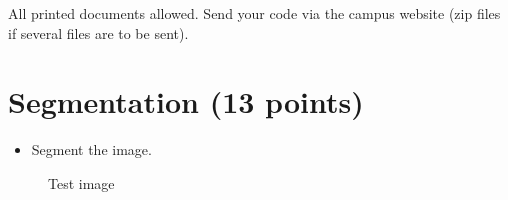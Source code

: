 \begin{note}All printed documents allowed. Send your code via the campus website (zip files if several files are to be sent).\end{note}

\section{Segmentation (13 points)}
% 

\begin{qbox}
 \begin{itemize}
  \item Segment the image.
 \end{itemize}

\end{qbox}

\begin{figure}[htbp]
\centering\caption{Test image}%
  \hspace{1cm}
 \label{fig:test}
 \vspace*{-10pt}
\end{figure}

